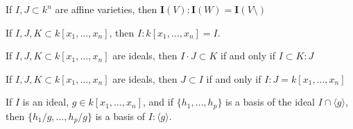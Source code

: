 \documentclass[crop=false,class=book,oneside]{standalone}
\begin{document}
                \begin{theorem}
                    If $I,J\subset k^n$ are affine varieties,
                    then $\textbf{I}(V):\textbf{I}(W)=\textbf{I}(V\setminus)$
                \end{theorem}
                \begin{theorem}
                    If $I,J,K\subset k[x_1,\hdots ,x_n]$,
                    then $I:k[x_1,\hdots ,x_n]=I$.
                \end{theorem}
                \begin{theorem}
                    If $I,J,K \subset k[x_1,\hdots ,x_n]$ are ideals,
                    then $I\cdot J\subset K$ if and only if $I\subset K:J$
                \end{theorem}
                \begin{theorem}
                    If $I,J,K\subset k[x_1,\hdots ,x_n]$ are ideals,
                    then $J\subset I$ if and only if
                    $I:J=k[x_1,\hdots ,x_n]$
                \end{theorem}
                \begin{theorem}
                    If $I$ is an ideal, $g\in k[x_1,\hdots ,x_n]$,
                    and if $\{h_1,\hdots, h_p\}$ is a basis of the
                    ideal $I\cap \langle g \rangle$, then
                    $\{h_1/g,\hdots, h_p/g\}$ is a basis of
                    $I:\langle g\rangle$.
                \end{theorem}
\end{document}
